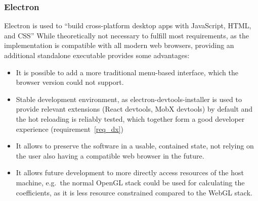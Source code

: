   \subsubsection*{Electron}
  Electron is used to ``build cross-platform desktop apps with JavaScript, HTML,
  and CSS''\cite*{noauthor_electron:_2018} While theoretically not necessary to
  fulfill most requirements, as the implementation is compatible with all modern
  web browsers, providing an additional standalone executable provides some advantages:
  \begin{itemize}
\item It is possible to add a more traditional menu-based interface, which the
  browser version could not support.
  \item Stable development environment, as electron-devtools-installer is used
    to provide relevant extensions (React devtools, MobX devtools) by default
    and the hot reloading is reliably tested, which together form a good
    developer experience (requirement~\ref{req_dx})
  \item It allows to preserve the software in a usable, contained state, not
    relying on the user also having a compatible web browser in the future.
\item It allows future development to more directly access resources of the host
  machine, e.g.\ the normal OpenGL stack could be used for calculating the
  coefficients, as it is less resource constrained compared to the WebGL stack.
  \end{itemize}
